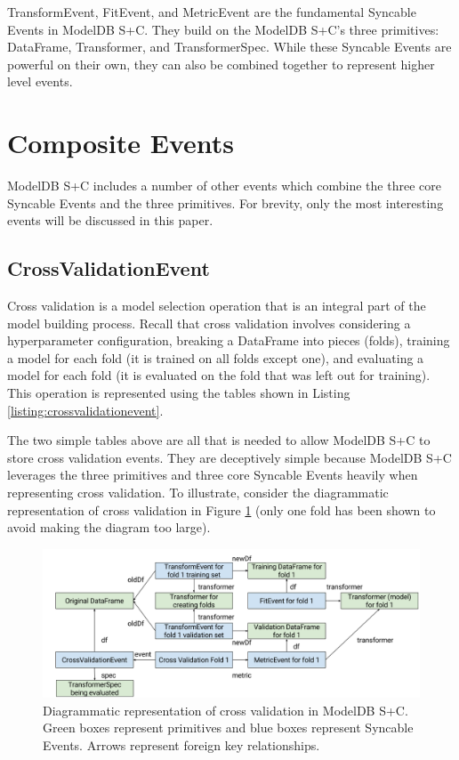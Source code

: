 TransformEvent, FitEvent, and MetricEvent are the fundamental Syncable Events in ModelDB S+C. They build on the
ModelDB S+C's three primitives: DataFrame, Transformer, and TransformerSpec. While these Syncable Events are powerful on
their own, they can also be combined together to represent higher level events.

\section{Composite Events}
ModelDB S+C includes a number of other events which combine the three core Syncable Events and the three primitives.
For brevity, only the most interesting events will be discussed in this paper.

\subsection{CrossValidationEvent}
Cross validation is a model selection operation that is an integral part of the
model building process. Recall that cross validation involves considering a hyperparameter
configuration, breaking a DataFrame into pieces (folds), training a model for each fold (it
is trained on all folds except one), and evaluating a model for each fold (it is evaluated on
the fold that was left out for training). This operation is represented using 
the tables shown in Listing \ref{listing:crossvalidationevent}.

The two simple tables above are all that is needed to allow ModelDB S+C to store
cross validation events. They are deceptively simple because ModelDB S+C leverages
the three primitives and three core Syncable Events heavily when representing cross validation.
To illustrate, consider the diagrammatic representation of cross validation in Figure
\ref{fig:cross_validation_event} (only one fold has been shown to avoid making the diagram too large).

\begin{figure}
  \centering
  \includegraphics[width=5.0in]{cross_validation_event}
  \caption{
    Diagrammatic representation of cross validation in ModelDB S+C. Green boxes
    represent primitives and blue boxes represent Syncable Events. Arrows
    represent foreign key relationships.
  }
  \label{fig:cross_validation_event}
\end{figure}


